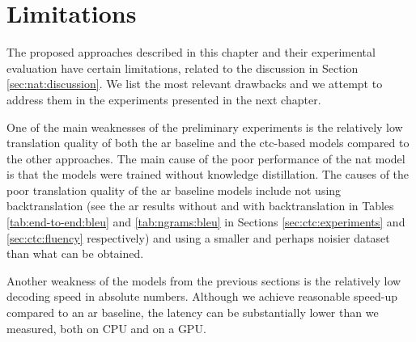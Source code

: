 \section{Limitations}
\label{sec:ctc:limitations}

The proposed approaches described in this chapter and their experimental
evaluation have certain limitations, related to the discussion in Section
\ref{sec:nat:discussion}. We list the most relevant drawbacks and we attempt to
address them in the experiments presented in the next chapter.

One of the main weaknesses of the preliminary experiments is the relatively low
translation quality of both the \acl{ar} baseline and the \acs{ctc}-based
models compared to the other approaches. The main cause of the poor performance
of the \ac{nat} model is that the models were trained without knowledge
distillation. The causes of the poor translation quality of the \ac{ar}
baseline models include not using backtranslation (see the \ac{ar} results
without and with backtranslation in Tables \ref{tab:end-to-end:bleu} and
\ref{tab:ngrams:bleu} in Sections \ref{sec:ctc:experiments} and
\ref{sec:ctc:fluency} respectively) and using a smaller and perhaps noisier
dataset than what can be obtained.

Another weakness of the models from the previous sections is the relatively low
decoding speed in absolute numbers. Although we achieve reasonable speed-up
compared to an \ac{ar} baseline, the latency can be substantially lower than we
measured, both on CPU and on a GPU.


